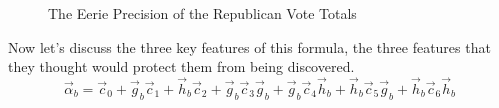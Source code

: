 \documentclass[preprint,13pt]{elsarticle}
\begin{document}
\begin{figure}[bp!]
\begin{center}
\caption{The Eerie Precision of the Republican Vote Totals}
\noindent{}
\end{center}
\end{figure}
\newpage
Now let's discuss the three key features of this formula, the three features that they thought would protect them from being discovered.
$$\vec{\alpha}_b=\vec{c}_{0}+\vec{g}_{b}\vec{c}_{1}+\vec{h}_{b}\vec{c}_{2}+\vec{g}_{b}\vec{c}_{3}\vec{g}_{b}+\vec{g}_{b}\vec{c}_{4}\vec{h}_{b}+\vec{h}_{b}\vec{c}_{5}\vec{g}_{b}+\vec{h}_{b}\vec{c}_{6}\vec{h}_{b}$$
\end{document}

